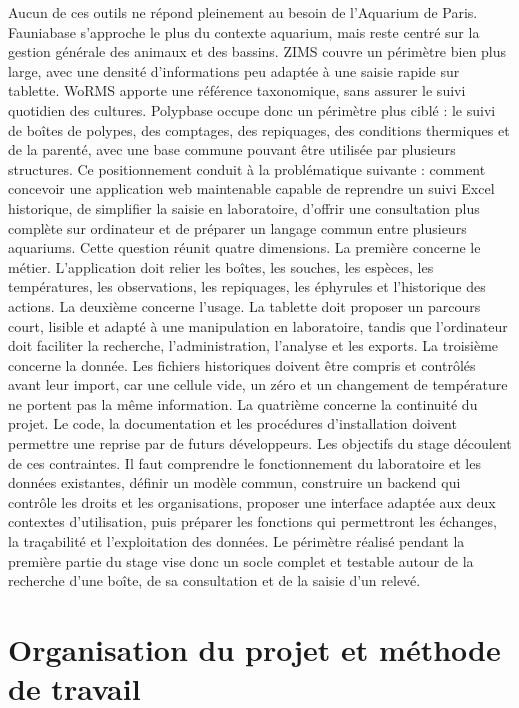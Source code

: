 \documentclass{article}
\let\oldsection\section
\renewcommand{\section}{\clearpage\oldsection}
\begin{document}
Aucun de ces outils ne répond pleinement au besoin de l'Aquarium de Paris. Fauniabase s'approche le plus du contexte aquarium, mais reste centré sur la gestion générale des animaux et des bassins. ZIMS couvre un périmètre bien plus large, avec une densité d’informations peu adaptée à une saisie rapide sur tablette. WoRMS apporte une référence taxonomique, sans assurer le suivi quotidien des cultures. Polypbase occupe donc un périmètre plus ciblé : le suivi de boîtes de polypes, des comptages, des repiquages, des conditions thermiques et de la parenté, avec une base commune pouvant être utilisée par plusieurs structures.
Ce positionnement conduit à la problématique suivante : comment concevoir une application web maintenable capable de reprendre un suivi Excel historique, de simplifier la saisie en laboratoire, d’offrir une consultation plus complète sur ordinateur et de préparer un langage commun entre plusieurs aquariums.
Cette question réunit quatre dimensions. La première concerne le métier. L’application doit relier les boîtes, les souches, les espèces, les températures, les observations, les repiquages, les éphyrules et l’historique des actions. La deuxième concerne l’usage. La tablette doit proposer un parcours court, lisible et adapté à une manipulation en laboratoire, tandis que l’ordinateur doit faciliter la recherche, l’administration, l’analyse et les exports. La troisième concerne la donnée. Les fichiers historiques doivent être compris et contrôlés avant leur import, car une cellule vide, un zéro et un changement de température ne portent pas la même information. La quatrième concerne la continuité du projet. Le code, la documentation et les procédures d’installation doivent permettre une reprise par de futurs développeurs.
Les objectifs du stage découlent de ces contraintes. Il faut comprendre le fonctionnement du laboratoire et les données existantes, définir un modèle commun, construire un backend qui contrôle les droits et les organisations, proposer une interface adaptée aux deux contextes d’utilisation, puis préparer les fonctions qui permettront les échanges, la traçabilité et l’exploitation des données. Le périmètre réalisé pendant la première partie du stage vise donc un socle complet et testable autour de la recherche d’une boîte, de sa consultation et de la saisie d’un relevé.


\section{Organisation du projet et méthode de travail}
\end{document}
